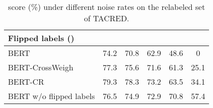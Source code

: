 \documentclass[11pt]{article}
\begin{document}
\begin{table}[t]
    \centering
    \caption{ score (\%) of alternative noise filtering strategies on the test set of TACRED. The best results are achieved when  for both methods.}
    \label{tab:ablation}
\end{table}

\begin{table}[t]
    \centering
    \caption{ score (\%) of different functions for  on the relabeled test set of TACRED.}
    \label{tab:other_functions}
\end{table}

\begin{table}[t]
    \centering
{\small
    \setlength{\tabcolsep}{3pt}
    \begin{tabular}{lccccc}
    \toprule
     \textbf{Flipped labels ()} & & & & &  \\
     \midrule
     BERT& 74.2& 70.8& 62.9& 48.6& 0\\
     BERT-CrossWeigh& 77.3& 75.6& 71.6& 61.3& 25.1\\
     BERT-CR& 79.3& 78.3&
     73.2& 63.5& 34.1\\
     \midrule
     BERT w/o flipped labels& 76.5& 74.9& 72.9& 70.8& 57.4\\
    \bottomrule
    \end{tabular}
    }
    \caption{ score (\%) under different noise rates on the relabeled set of TACRED.}
    \label{tab:noise_rates}
\end{table}
\end{document}

